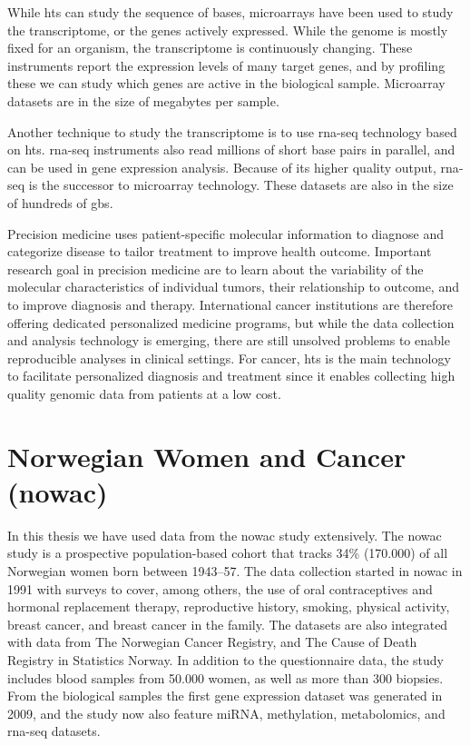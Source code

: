 While \gls{hts} can study the sequence of bases, microarrays have been used to
study the transcriptome, or the genes actively expressed. While the genome is
mostly fixed for an organism, the transcriptome is continuously changing. These
instruments report the expression levels of many target genes, and
by profiling these we can study which genes are active in the biological sample.
Microarray datasets are in the size of megabytes per sample. 

Another technique to study the transcriptome is to use \gls{rna}-seq technology
based on \gls{hts}. \gls{rna}-seq instruments also read millions of short base
pairs in parallel, and can be used in gene expression analysis. Because of its
higher quality output, \gls{rna}-seq is the successor to microarray technology.
These datasets are also in the size of hundreds of \glspl{gb}.

Precision medicine uses patient-specific molecular information to diagnose and
categorize disease to tailor treatment to improve health
outcome.\cite{national2011toward} Important research goal in precision medicine
are to learn about the variability of the molecular characteristics of
individual tumors, their relationship to outcome, and to improve diagnosis and
therapy.\cite{tannock2016limits} International cancer institutions are therefore
offering dedicated personalized medicine programs, but while the data collection
and analysis technology is emerging, there are still unsolved problems to enable
reproducible analyses in clinical settings. For cancer, \gls{hts}
is the main technology to facilitate personalized diagnosis and
treatment since it enables collecting high quality genomic data from patients
at a low cost. 

\section{Norwegian Women and Cancer (\gls{nowac})}
In this thesis we have used data from the \gls{nowac} study extensively. 
The \gls{nowac} study is a prospective population-based cohort that tracks 34\%
(170.000) of all Norwegian women born between 1943–57.\cite{nowac} The data
collection started in \gls{nowac} in 1991 with surveys to cover, among others,
the use of oral contraceptives and hormonal replacement therapy, reproductive
history, smoking, physical activity, breast cancer, and breast cancer in the
family. The datasets are also integrated with data from The Norwegian Cancer
Registry, and The Cause of Death Registry in Statistics Norway. In addition
to the questionnaire data, the study includes blood samples from 50.000 women,
as well as more than 300 biopsies. From the biological samples the first gene
expression dataset was generated in 2009, and the study now also feature miRNA,
methylation, metabolomics, and \gls{rna}-seq datasets. 

